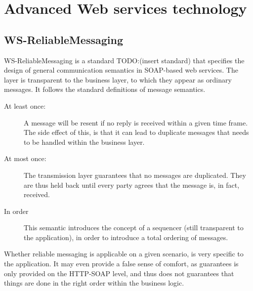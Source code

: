 \chapter{Advanced Web services technology}

\section{WS-ReliableMessaging}
WS-ReliableMessaging is a standard TODO:(insert standard) that specifies the design of general communication semantics in SOAP-based web services. The layer is transparent to the business layer, to which they appear as ordinary messages.
It follows the standard definitions of message semantics.
\begin{description}
\item[At least once:] A message will be resent if no reply is received within a given time frame. The side effect of this, is that it can lead to duplicate messages that needs to be handled within the business layer.
\item[At most once:] The transmission layer guarantees that no messages are duplicated. They are thus held back until every party agrees that the message is, in fact, received.
\item[In order] This semantic introduces the concept of a sequencer (still transparent to the application), in order to introduce a total ordering of messages.
\end{description}
Whether reliable messaging is applicable on a given scenario, is very specific to the application. It may even provide a false sense of comfort, as guarantees is only provided on the HTTP-SOAP level, and thus does not guarantees that things are done in the right order within the business logic.


